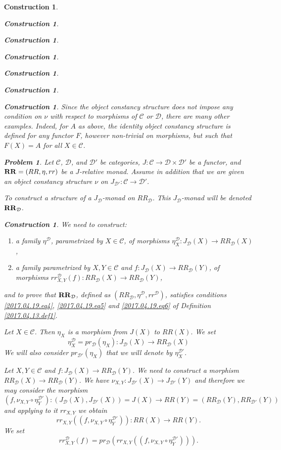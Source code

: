 \documentclass[12pt]{amsart}
\numberwithin{proposition}{subsection}
\newtheorem{problem}[proposition]{Problem}
\newtheorem{construction}[proposition]{Construction}
\newcommand{\llabel}[1]{\label{#1}}
\newcommand{\sr}{\rightarrow}
\newcommand{\RR}{{\bf RR}}
\newcommand{\C}{{\mathcal C}}
\newcommand{\D}{{\mathcal D}}
\begin{document}
\begin{construction}
\begin{construction}
\begin{construction}
\begin{construction}
\begin{construction}
\begin{construction}
\begin{construction}
Since the object constancy structure does not impose any condition on $\nu$
with respect to morphisms of $\C$ or $\D$, there are many other
examples. Indeed, for $A$ as above, the identity object constancy structure is
defined for any functor $F$, however non-trivial on morphisms, but such that
$F(X)=A$ for all $X\in\C$.
%
\begin{problem}
\llabel{2017.04.21.prob1}
Let $\C$, $\D$, and $\D'$ be categories, $J:\C\sr \D\times\D'$ be a functor, and
$\RR=(RR,\eta,rr)$ be a $J$-relative monad. Assume in addition that we are given
an object constancy structure $\nu$ on $J_{\D'}:\C\sr\D'$.

To construct a structure of a $J_{\D}$-monad on $RR_{\D}$. This $J_{\D}$-monad will be denoted $\RR_{\D}$.
\end{problem}
%
\begin{construction}\rm
\llabel{2017.04.21.constr1}
We need to construct:
%
\begin{enumerate}
\item a family $\eta^{\D}$, parametrized by $X\in\C$, of morphisms $\eta^{\D}_X:J_{\D}(X)\sr RR_{\D}(X)$,
\item a family parametrized by $X,Y\in\C$ and $f:J_{\D}(X)\sr RR_{\D}(Y)$, of morphisms $rr^{\D}_{X,Y}(f):RR_{\D}(X)\sr RR_{\D}(Y)$,
\end{enumerate}
%
and to prove that $\RR_{\D}$, defined as $(RR_{\D},\eta^{\D},rr^{\D})$,
satisfies conditions \ref{2017.04.19.eq4}, \ref{2017.04.19.eq5} and
\ref{2017.04.19.eq6} of Definition \ref{2017.04.13.def1}.

Let $X\in\C$. Then $\eta_X$ is a morphism from $J(X)$ to $RR(X)$. We set 
%
\begin{equation}
\llabel{2017.04.21.eq1}
\eta^{\D}_X=pr_{\D}(\eta_X):J_{\D}(X)\sr RR_{\D}(X)
\end{equation}%
%
We will also consider $pr_{\D'}(\eta_X)$ that we will denote by $\eta^{\D'}_X$. 

Let $X,Y\in\C$ and $f:J_{\D}(X)\sr RR_{\D}(Y)$. We need to construct a morphism
$RR_{\D}(X)\sr RR_{\D}(Y)$. We have $\nu_{X,Y}:J_{\D'}(X)\sr J_{\D'}(Y)$ and
therefore we may consider the morphism
%
$$(f,\nu_{X,Y}\circ \eta^{\D'}_Y):(J_{\D}(X),J_{\D'}(X))=J(X)\sr RR(Y)=(RR_{\D}(Y),RR_{\D'}(Y))$$
%
and applying to it $rr_{X,Y}$ we obtain 
%
$$rr_{X,Y}((f,\nu_{X,Y}\circ \eta^{\D'}_Y)):RR(X)\sr RR(Y).$$
%
We set
%
\begin{equation}
\llabel{2017.04.21.eq2}
rr^{\D}_{X,Y}(f)=pr_{\D}(rr_{X,Y}((f,\nu_{X,Y}\circ \eta^{\D'}_Y))).
\end{equation}%
%


\end{construction}
\end{construction}
\end{construction}
\end{construction}
\end{construction}
\end{construction}
\end{construction}
\end{construction}
\end{document}
